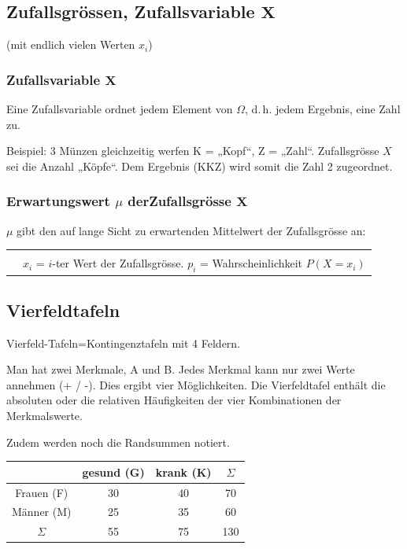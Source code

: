 \begin{multicols}{2}
\keinHeaderUndKeinFooter{}

\subsection*{Zufallsgrössen, Zufallsvariable $\mathbf{X}$}
\keinHeaderUndKeinFooter{}

(mit endlich vielen Werten $x_i$)

\subsubsection*{Zufallsvariable $\mathbf{X}$}

Eine Zufallsvariable ordnet jedem Element von $\Omega$, d.\,h. jedem
Ergebnis, eine Zahl zu.

Beispiel: 3 Münzen gleichzeitig werfen K = „Kopf“, Z = „Zahl“.
Zufallsgrösse $X$ sei \zB die Anzahl „Köpfe“.
Dem Ergebnis (KKZ) wird somit die Zahl 2 zugeordnet.

\subsubsection*{Erwartungswert $\mu$ derZufallsgrösse $\mathbf{X}$}
$\mu$ gibt den auf lange Sicht zu erwartenden Mittelwert der
Zufallsgrösse an:

\begin{tabular}{cp{5cm}}
\hline\\
\raisebox{-4mm}{\fbox{$\mu=\sum\limits_{i=1}^n x_i\cdot{}p_i$}} & $x_i$ = $i$-ter Wert der
Zufallsgrösse. $p_i$ = Wahrscheinlichkeit  $P(X=x_i)$\\
 \hline
 \end{tabular}


\subsection*{Vierfeldtafeln}
Vierfeld-Tafeln=Kontingenztafeln mit 4 Feldern.

Man hat zwei Merkmale, A und B. Jedes Merkmal kann nur zwei Werte
annehmen (+ / -). Dies ergibt vier Möglichkeiten. Die Vierfeldtafel
enthält die absoluten oder die relativen Häufigkeiten der vier
Kombinationen der Merkmalswerte.

Zudem werden noch die Randsummen notiert.


\begin{tabular}{c|c|c|c}
           & gesund (G)& krank (K)& $\Sigma$ \\\hline
Frauen (F) &        30 &       40 &       70 \\\hline
Männer (M) &        25 &       35 &       60 \\\hline
$\Sigma$   &        55 &       75 &      130 \\\hline
 \end{tabular}


\end{multicols}
